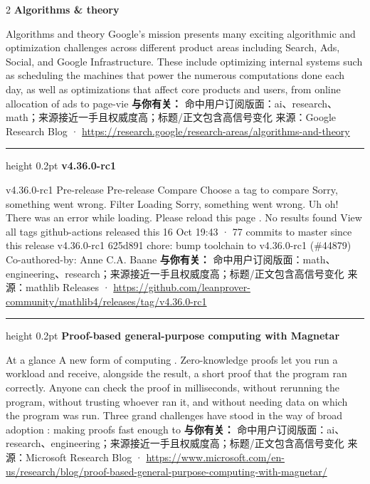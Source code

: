 \documentclass[10.5pt]{ctexart}
\begin{document}
\begin{multicols}{2}
{\large\bfseries Algorithms \& theory}\par
Algorithms and theory Google’s mission presents many exciting algorithmic and optimization challenges across different product areas including Search, Ads, Social, and Google Infrastructure. These include optimizing internal systems such as scheduling the machines that power the numerous computations done each day, as well as optimizations that affect core products and users, from online allocation of ads to page-vie
\textbf{与你有关：} 命中用户订阅版面：ai、research、math；来源接近一手且权威度高；标题/正文包含高信号变化
{\footnotesize\color{ormuted} 来源：Google Research Blog · \url{https://research.google/research-areas/algorithms-and-theory}}
\vspace{2mm}
\hrule height 0.2pt
\vspace{2mm}
{\large\bfseries v4.36.0-rc1}\par
v4.36.0-rc1 Pre-release Pre-release Compare Choose a tag to compare Sorry, something went wrong. Filter Loading Sorry, something went wrong. Uh oh! There was an error while loading. Please reload this page . No results found View all tags github-actions released this 16 Oct 19:43 · 77 commits to master since this release v4.36.0-rc1 625d891 chore: bump toolchain to v4.36.0-rc1 (\#44879) Co-authored-by: Anne C.A. Baane
\textbf{与你有关：} 命中用户订阅版面：math、engineering、research；来源接近一手且权威度高；标题/正文包含高信号变化
{\footnotesize\color{ormuted} 来源：mathlib Releases · \url{https://github.com/leanprover-community/mathlib4/releases/tag/v4.36.0-rc1}}
\vspace{2mm}
\hrule height 0.2pt
\vspace{2mm}
{\large\bfseries Proof-based general-purpose computing with Magnetar}\par
At a glance A new form of computing . Zero-knowledge proofs let you run a workload and receive, alongside the result, a short proof that the program ran correctly. Anyone can check the proof in milliseconds, without rerunning the program, without trusting whoever ran it, and without needing data on which the program was run. Three grand challenges have stood in the way of broad adoption : making proofs fast enough to
\textbf{与你有关：} 命中用户订阅版面：ai、research、engineering；来源接近一手且权威度高；标题/正文包含高信号变化
{\footnotesize\color{ormuted} 来源：Microsoft Research Blog · \url{https://www.microsoft.com/en-us/research/blog/proof-based-general-purpose-computing-with-magnetar/}}

\end{multicols}
\end{document}
